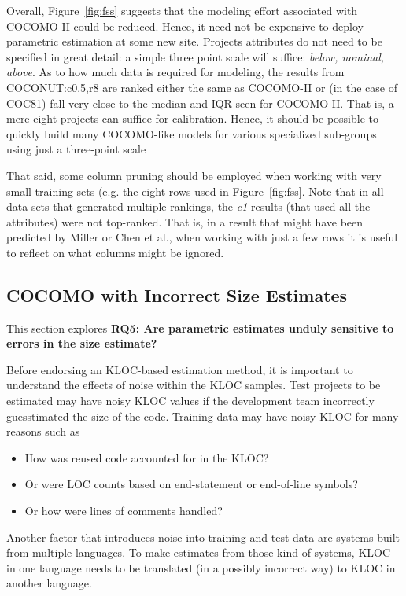 \documentclass{sig-alternate}
\newcommand{\bi}{\begin{itemize}}
\newcommand{\ei}{\end{itemize}}
\newcommand{\fig}[1]{Figure~\ref{fig:#1}}
\begin{document}
Overall, \fig{fss} suggests that the modeling
effort associated with COCOMO-II could be reduced. Hence,
it need not be expensive to deploy parametric estimation
at some new site.
Projects attributes
do not need to be specified in great detail:
a simple three point scale will suffice:
 {\em below, nominal, above}. As to how much data is
required for modeling, 
the results
from COCONUT:c0.5,r8 are ranked either the same as
COCOMO-II or (in the case of COC81) fall very close
to the median and IQR seen for COCOMO-II.
That is, 
a mere eight projects can
suffice for calibration.
Hence, it
should be possible to quickly build many COCOMO-like
models for various specialized sub-groups using just
a three-point scale

That said, some column pruning should be employed
when working with very small training sets (e.g.
the eight rows used in \fig{fss}. 
Note that
in all data sets that generated multiple rankings,
the {\em c1} results (that used all the attributes)
were not top-ranked. That is, in a result that might
have been predicted by Miller or Chen et al., when
working with just a few rows it is useful to
reflect on what columns might be ignored.




\subsection{COCOMO with Incorrect Size Estimates}\label{sect:nonoise}

This section explores
{\bf RQ5: Are parametric estimates unduly sensitive to
errors in the size estimate?}


Before endorsing an KLOC-based estimation method,
it is important to understand the effects of noise
within the KLOC samples. 
Test projects to be estimated may have noisy KLOC values if
the development team incorrectly guesstimated the size of
the code.
Training data may have noisy KLOC
for many reasons such as
\bi
\item How was reused code accounted
for in the KLOC?
\item Or were LOC counts based on end-statement
or end-of-line symbols?
\item Or how were lines of comments handled?
\ei
Another factor that introduces noise into training and test
data are systems built from multiple languages. 
To make estimates from  those kind
of systems, KLOC in one language needs to be translated (in a possibly incorrect way) to KLOC in another language.
\end{document}
